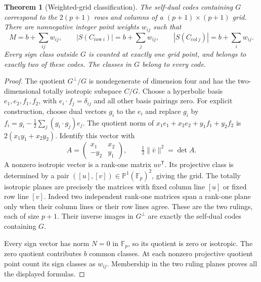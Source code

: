 \documentclass[11pt]{article}
\newtheorem{theorem}{Theorem}[section]
\begin{document}
\begin{theorem}[Weighted-grid classification]
The self-dual codes containing $G$ correspond to the $2(p+1)$ rows
and columns of a $(p+1)\times(p+1)$ grid. There are nonnegative
integer point weights $w_{ij}$ such that
\[
 M=b+\sum_{ij}w_{ij},\qquad
 |S(C_{\mathrm{row}\ i})|=b+\sum_jw_{ij},\qquad
 |S(C_{\mathrm{col}\ j})|=b+\sum_iw_{ij}.
\]
Every sign class outside $G$ is counted at exactly one grid point,
and belongs to exactly two of these codes. The classes in $G$ belong
to every code.
\end{theorem}
\begin{proof}
The quotient $G^\perp/G$ is nondegenerate of dimension four and has
the two-dimensional totally isotropic subspace $C/G$. Choose a
hyperbolic basis $e_1,e_2,f_1,f_2$, with $e_i\cdot f_j=\delta_{ij}$
and all other basis pairings zero. For explicit construction, choose
dual vectors $g_i$ to the $e_i$ and replace
$g_i$ by $f_i=g_i-\frac12\sum_j(g_i\cdot g_j)e_j$.
The quotient norm of $x_1e_1+x_2e_2+y_1f_1+y_2f_2$ is
$2(x_1y_1+x_2y_2)$. Identify this vector with
\[
 A=\begin{pmatrix}x_1&x_2\\-y_2&y_1\end{pmatrix},
 \qquad \tfrac12\|\bar v\|^2=\det A.
\]
A nonzero isotropic vector is a rank-one matrix $uv^{\mathsf T}$.
Its projective class is determined by a pair
$([u],[v])\in\mathbb P^1(\mathbb F_p)^2$, giving the grid.
The totally isotropic planes are precisely the matrices with fixed
column line $[u]$ or fixed row line $[v]$. Indeed two independent
rank-one matrices span a rank-one plane only when their column lines
or their row lines agree. These are the two rulings, each of size $p+1$.
Their inverse images in $G^\perp$ are exactly the self-dual codes
containing $G$.

Every sign vector has norm $N=0$ in $\mathbb F_p$, so its quotient
is zero or isotropic. The zero quotient contributes $b$ common
classes. At each nonzero projective quotient point count its sign
classes as $w_{ij}$. Membership in the two ruling planes proves
all the displayed formulas.
\end{proof}
\end{document}
